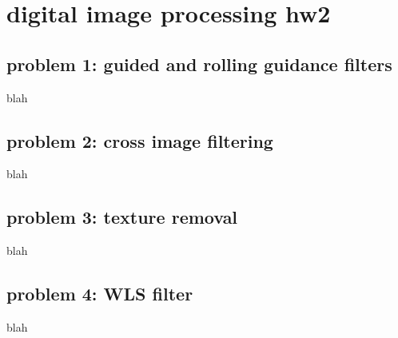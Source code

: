 \documentclass[extendedabs]{bmvc2k}
\begin{document}
\section*{digital image processing hw2}
\subsection*{problem 1: guided and rolling guidance filters}

blah

\subsection*{problem 2: cross image filtering}

blah

\subsection*{problem 3: texture removal}

blah

\subsection*{problem 4: WLS filter}

blah
\end{document}
